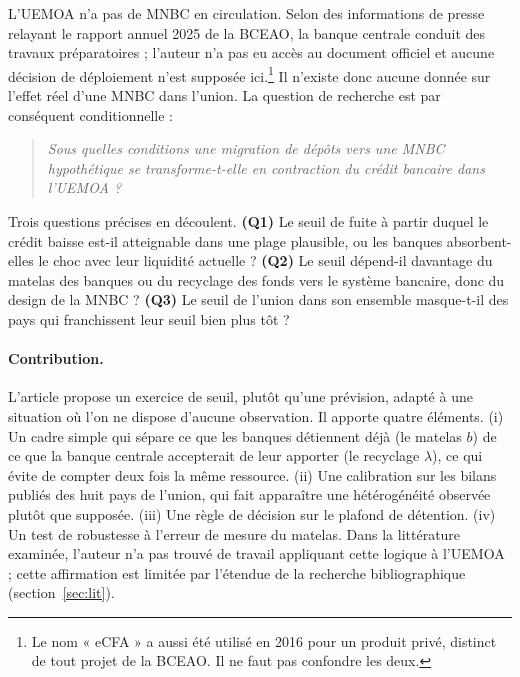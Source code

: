 \documentclass[11pt,a4paper]{article}
\begin{document}
	L'UEMOA n'a pas de MNBC en circulation. Selon des informations de presse relayant le rapport annuel 2025 de la BCEAO, la banque centrale conduit des travaux préparatoires ; l'auteur n'a pas eu accès au document officiel et aucune décision de déploiement n'est supposée ici.\footnote{Le nom « eCFA » a aussi été utilisé en 2016 pour un produit privé, distinct de tout projet de la BCEAO. Il ne faut pas confondre les deux.} Il n'existe donc aucune donnée sur l'effet réel d'une MNBC dans l'union. La question de recherche est par conséquent conditionnelle :
	
	\begin{quote}
		\emph{Sous quelles conditions une migration de dépôts vers une MNBC hypothétique se transforme-t-elle en contraction du crédit bancaire dans l'UEMOA ?}
	\end{quote}
	
	Trois questions précises en découlent. \textbf{(Q1)} Le seuil de fuite à partir duquel le crédit baisse est-il atteignable dans une plage plausible, ou les banques absorbent-elles le choc avec leur liquidité actuelle ? \textbf{(Q2)} Le seuil dépend-il davantage du matelas des banques ou du recyclage des fonds vers le système bancaire, donc du design de la MNBC ? \textbf{(Q3)} Le seuil de l'union dans son ensemble masque-t-il des pays qui franchissent leur seuil bien plus tôt ?
	
	\paragraph{Contribution.} L'article propose un exercice de seuil, plutôt qu'une prévision, adapté à une situation où l'on ne dispose d'aucune observation. Il apporte quatre éléments. (i) Un cadre simple qui sépare ce que les banques détiennent déjà (le matelas $b$) de ce que la banque centrale accepterait de leur apporter (le recyclage $\lambda$), ce qui évite de compter deux fois la même ressource. (ii) Une calibration sur les bilans publiés des huit pays de l'union, qui fait apparaître une hétérogénéité observée plutôt que supposée. (iii) Une règle de décision sur le plafond de détention. (iv) Un test de robustesse à l'erreur de mesure du matelas. Dans la littérature examinée, l'auteur n'a pas trouvé de travail appliquant cette logique à l'UEMOA ; cette affirmation est limitée par l'étendue de la recherche bibliographique (section~\ref{sec:lit}).
	
\end{document}
